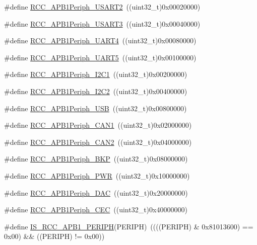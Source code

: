 \begin{DoxyCompactItemize}
\item 
\#define \hyperlink{group___a_p_b1__peripheral_gaa69c77220b943a42a4bacb8a3bf87dd0}{R\+C\+C\+\_\+\+A\+P\+B1\+Periph\+\_\+\+U\+S\+A\+R\+T2}~((uint32\+\_\+t)0x00020000)
\item 
\#define \hyperlink{group___a_p_b1__peripheral_gaf72838a63d7d6200f251c1eb334cbaac}{R\+C\+C\+\_\+\+A\+P\+B1\+Periph\+\_\+\+U\+S\+A\+R\+T3}~((uint32\+\_\+t)0x00040000)
\item 
\#define \hyperlink{group___a_p_b1__peripheral_ga839d7ae3386622158210ecf53d9cd989}{R\+C\+C\+\_\+\+A\+P\+B1\+Periph\+\_\+\+U\+A\+R\+T4}~((uint32\+\_\+t)0x00080000)
\item 
\#define \hyperlink{group___a_p_b1__peripheral_gaa00c73f88a7af45fb29df97b07acd856}{R\+C\+C\+\_\+\+A\+P\+B1\+Periph\+\_\+\+U\+A\+R\+T5}~((uint32\+\_\+t)0x00100000)
\item 
\#define \hyperlink{group___a_p_b1__peripheral_ga594f87d504f7d63697d841033d1538f6}{R\+C\+C\+\_\+\+A\+P\+B1\+Periph\+\_\+\+I2\+C1}~((uint32\+\_\+t)0x00200000)
\item 
\#define \hyperlink{group___a_p_b1__peripheral_ga8eaeded403b5a2277fbfb3896c639416}{R\+C\+C\+\_\+\+A\+P\+B1\+Periph\+\_\+\+I2\+C2}~((uint32\+\_\+t)0x00400000)
\item 
\#define \hyperlink{group___a_p_b1__peripheral_ga69a1b3de9a59155bc8455eea5a15e3e4}{R\+C\+C\+\_\+\+A\+P\+B1\+Periph\+\_\+\+U\+SB}~((uint32\+\_\+t)0x00800000)
\item 
\#define \hyperlink{group___a_p_b1__peripheral_ga7f1d940739de0134ae89e9e04214989d}{R\+C\+C\+\_\+\+A\+P\+B1\+Periph\+\_\+\+C\+A\+N1}~((uint32\+\_\+t)0x02000000)
\item 
\#define \hyperlink{group___a_p_b1__peripheral_ga62801597b97816751c038acb1466179c}{R\+C\+C\+\_\+\+A\+P\+B1\+Periph\+\_\+\+C\+A\+N2}~((uint32\+\_\+t)0x04000000)
\item 
\#define \hyperlink{group___a_p_b1__peripheral_ga2a26b65d0e38030e414a9d39276645b1}{R\+C\+C\+\_\+\+A\+P\+B1\+Periph\+\_\+\+B\+KP}~((uint32\+\_\+t)0x08000000)
\item 
\#define \hyperlink{group___a_p_b1__peripheral_ga59ae4e17d5b35a934b1614f8ee883834}{R\+C\+C\+\_\+\+A\+P\+B1\+Periph\+\_\+\+P\+WR}~((uint32\+\_\+t)0x10000000)
\item 
\#define \hyperlink{group___a_p_b1__peripheral_ga8d019a727701634822c19371b6aaabb5}{R\+C\+C\+\_\+\+A\+P\+B1\+Periph\+\_\+\+D\+AC}~((uint32\+\_\+t)0x20000000)
\item 
\#define \hyperlink{group___a_p_b1__peripheral_gaa96437b649e13586945f40dac318a0ae}{R\+C\+C\+\_\+\+A\+P\+B1\+Periph\+\_\+\+C\+EC}~((uint32\+\_\+t)0x40000000)
\item 
\#define \hyperlink{group___a_p_b1__peripheral_gab68e85308494436c4c55a69c42a79f36}{I\+S\+\_\+\+R\+C\+C\+\_\+\+A\+P\+B1\+\_\+\+P\+E\+R\+I\+PH}(P\+E\+R\+I\+PH)~((((P\+E\+R\+I\+PH) \& 0x81013600) == 0x00) \&\& ((\+P\+E\+R\+I\+P\+H) != 0x00))
\end{DoxyCompactItemize}


